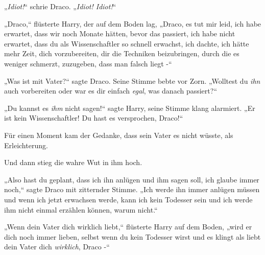 „\emph{Idiot!}“ schrie Draco. „\emph{Idiot! Idiot!}“

„Draco,“ flüsterte Harry, der auf dem Boden lag, „Draco, es tut mir leid, ich habe erwartet, dass wir noch Monate hätten, bevor das passiert, ich habe nicht erwartet, dass du als Wissenschaftler so schnell erwachst, ich dachte, ich hätte mehr Zeit, dich vorzubereiten, dir die Techniken beizubringen, durch die es weniger schmerzt, zuzugeben, dass man falsch liegt -“

„Was ist mit Vater?“ sagte Draco. Seine Stimme bebte vor Zorn. „Wolltest du \emph{ihn} auch vorbereiten oder war es dir einfach \emph{egal}, was danach passiert?“

„Du kannst es \emph{ihm} nicht sagen!“ sagte Harry, seine Stimme klang alarmiert. „Er ist kein Wissenschaftler! Du hast es versprochen, Draco!“

Für einen Moment kam der Gedanke, dass sein Vater es nicht wüsste, als Erleichterung.

Und dann stieg die wahre Wut in ihm hoch.

„Also hast du geplant, dass ich ihn anlügen und ihm sagen soll, ich glaube immer noch,“ sagte Draco mit zitternder Stimme. „Ich werde ihn immer anlügen müssen und wenn ich jetzt erwachsen werde, kann ich kein Todesser sein und ich werde ihm nicht einmal erzählen können, warum nicht.“

„Wenn dein Vater dich wirklich liebt,“ flüsterte Harry auf dem Boden, „wird er dich noch immer lieben, selbst wenn du kein Todesser wirst und es klingt als liebt dein Vater dich \emph{wirklich}, Draco -“

